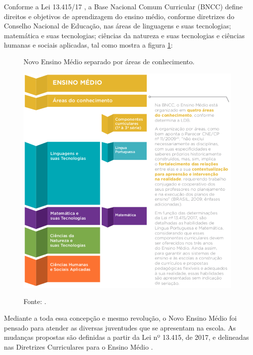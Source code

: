 Conforme a Lei 13.415/17 \cite{lei13415}, a Base Nacional Comum Curricular \sigla(BNCC) define direitos e objetivos de aprendizagem do ensino médio, conforme diretrizes do Conselho Nacional de Educação, nas áreas de linguagens e suas tecnologias; matemática e suas tecnologias; ciências da natureza e suas tecnologias e ciências humanas e sociais aplicadas, tal como mostra a figura \ref{figura:novo_ensino_medio}:

\begin{figure}[H]
	\caption{Novo Ensino Médio separado por áreas de conhecimento.}
	\centering %
	\includegraphics[width=14cm]{resources/novo_ensino_medio.png} %
	\label{figura:novo_ensino_medio}
	\captionsetup{singlelinecheck = false, format= hang, justification=raggedright, labelsep=space, width=14cm}
	\caption*{\footnotesize Fonte: .}
\end{figure}

Mediante a toda essa concepção e mesmo revolução, o Novo Ensino Médio foi pensado para atender as diversas juventudes que se apresentam na escola. As mudanças propostas são definidas a partir da Lei nº 13.415, de 2017, e delineadas nas Diretrizes Curriculares para o Ensino Médio \cite{res32016}.



